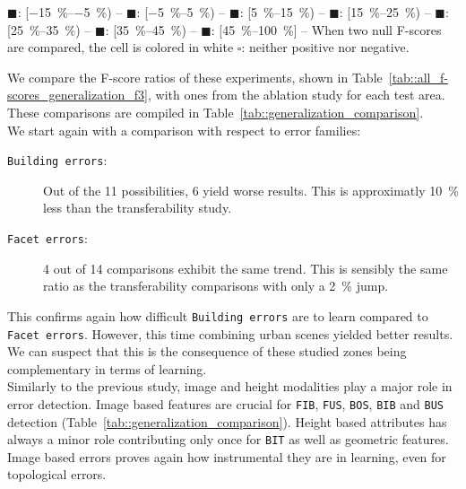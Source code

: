 \begin{table}[htbp]
{                \textcolor{LOSS0515}{\(\blacksquare\)}: [\SIrange[range-phrase={, }]{-15}{-5}{\percent}) --
                \textcolor{STBL}{\(\blacksquare\)}: [\SIrange[range-phrase={, }]{-5}{5}{\percent}) --
                \textcolor{GAIN0515}{\(\blacksquare\)}: [\SIrange[range-phrase={, }]{5}{15}{\percent}) --
                \textcolor{GAIN1525}{\(\blacksquare\)}: [\SIrange[range-phrase={, }]{15}{25}{\percent}) --
                \textcolor{GAIN2535}{\(\blacksquare\)}: [\SIrange[range-phrase={, }]{25}{35}{\percent}) --
                \textcolor{GAIN3545}{\(\blacksquare\)}: [\SIrange[range-phrase={, }]{35}{45}{\percent}) --
                \textcolor{GAIN45}{\(\blacksquare\)}: [\SIrange[range-phrase={, }]{45}{100}{\percent}] --
                When two null F-scores are compared, the cell is colored in white \(\square\): neither positive nor negative.
            }
        \end{table}
            
        We compare the F-score ratios of these experiments, shown in Table~\ref{tab::all_f-scores_generalization_f3}, with ones from the ablation study for each test area.
        These comparisons are compiled in Table~\ref{tab::generalization_comparison}.\\
    
        We start again with a comparison with respect to error families:
        \begin{description}
            \item[\texttt{Building errors}:] Out of the 11 possibilities, 6 yield worse results.
                    This is approximatly \SI{10}{\percent} less than the transferability study.
            \item[\texttt{Facet errors}:] 4 out of 14 comparisons exhibit the same trend.
                    This is sensibly the same ratio as the transferability comparisons with only a \SI{2}{\percent} jump.
        \end{description}
        This confirms again how difficult \texttt{Building errors} are to learn compared to \texttt{Facet errors}.
        However, this time combining urban scenes yielded better results.
        We can suspect that this is the consequence of these studied zones being complementary in terms of learning.\\
        
        Similarly to the previous study, image and height modalities play a major role in error detection.
        Image based features are crucial for \texttt{FIB}, \texttt{FUS}, \texttt{BOS}, \texttt{BIB} and \texttt{BUS} detection (Table~\ref{tab::generalization_comparison}).
        Height based attributes has always a minor role contributing only once for \texttt{BIT} as well as geometric features.
        Image based errors proves again how instrumental they are in learning, even for topological errors.\\
        
